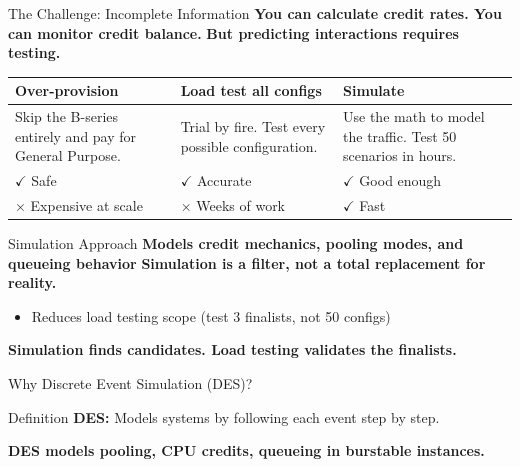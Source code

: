 \documentclass[11pt, aspectratio=169]{beamer}
\begin{document}
\begin{frame}{The Challenge: Incomplete Information}
    \textbf{You can calculate credit rates. You can monitor credit balance.}
    \textbf{But predicting interactions requires testing.}
    \vfill
    \begin{center}

        \begin{tabularx}{\textwidth}{YYY}
            \toprule
            \textbf{Over-provision} & \textbf{Load test all configs} & \textbf{Simulate} \\
            \midrule
            Skip the B-series entirely and pay for General Purpose. & Trial by fire. Test every possible configuration. & Use the math to model the traffic. Test 50 scenarios in hours. \\[0.8em]
            
            {\small\color{green!60!black}$\checkmark$ Safe} & 
            {\small\color{green!60!black}$\checkmark$ Accurate} & 
            {\small\color{green!60!black}$\checkmark$ Good enough} \\[0.5em]
            
            {\small\color{red!80!black}$\times$ Expensive at scale} & 
            {\small\color{red!80!black}$\times$ Weeks of work} & 
            {\small\color{green!60!black}$\checkmark$ Fast} \\
            \bottomrule
        \end{tabularx}
    \end{center}
\end{frame}

\begin{frame}{Simulation Approach}
    \textbf{Models credit mechanics, pooling modes, and queueing behavior}
    \vfill
    \textbf{Simulation is a filter, not a total replacement for reality.}
    \begin{itemize}
        \item Reduces load testing scope (test 3 finalists, not 50 configs)
    \end{itemize}
    \vfill
    \textbf{Simulation finds candidates. Load testing validates the finalists.}
\end{frame}

\begin{frame}{Why Discrete Event Simulation (DES)?}
    \begin{block}{Definition}
        \textbf{DES:} Models systems by following each event step by step.
    \end{block}

    \vfill
    \textbf{DES models pooling, CPU credits, queueing in burstable instances.}
\end{frame}
\end{document}
